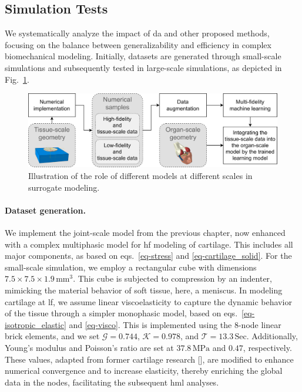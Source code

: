 \documentclass[12pt,a4paper]{report}
\begin{document}
\subsection{Simulation Tests}
%
We systematically analyze the impact of \ac{da} and other proposed methods, focusing on the balance between generalizability and efficiency in complex biomechanical modeling. Initially, datasets are generated through small-scale simulations and subsequently tested in large-scale simulations, as depicted in Fig.~\ref{fig:inductive}.

%
\begin{figure}\centering
\includegraphics[width=1\linewidth,keepaspectratio]{inductive.png}
\caption{Illustration of the role of different models at different scales in surrogate modeling.}\label{fig:inductive}
\end{figure}

\paragraph{Dataset generation.} We implement the joint-scale model from the previous chapter, now enhanced with a complex multiphasic model for \ac{hf} modeling of cartilage. This includes all major components, as based on eqs.~\ref{eq-stress} and \ref{eq-cartilage_solid}. For the small-scale simulation, we employ a rectangular cube with dimensions $7.5\times7.5\times1.9\, \text{mm}^3$. This cube is subjected to compression by an indenter, mimicking the material behavior of soft tissue, here, a meniscus. In modeling cartilage at \ac{lf}, we assume linear viscoelasticity to capture the dynamic behavior of the tissue through a simpler monophasic model, based on eqs.~\ref{eq-isotropic_elastic} and \ref{eq-visco}. This is implemented using the 8-node linear brick elements, and we set $\mathcal{G}=0.744$, $\mathcal{K}=0.978$, and $\mathcal{T}=13.3\,\text{Sec}$. Additionally, Young's modulus and Poisson's ratio are set at $37.8\,\text{MPa}$ and $0.47$, respectively. These values, adapted from former cartilage research [\cite{keenan2013}], are modified to enhance numerical convergence and to increase elasticity, thereby enriching the global data in the nodes, facilitating the subsequent \ac{hml} analyses.
\end{document}
